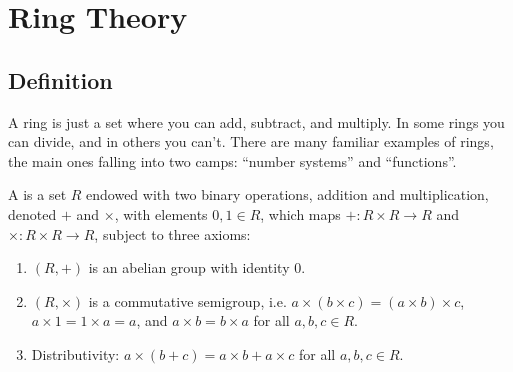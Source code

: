 \chapter{Ring Theory}
\section{Definition}
A ring is just a set where you can add, subtract, and multiply. In some rings you can divide, and in others you can't. There are many familiar examples of rings, the main ones falling into two camps: ``number systems'' and ``functions''.

\begin{definition}
A  is a set $R$ endowed with two binary operations, addition and multiplication, denoted $+$ and $\times$, with elements $0,1\in R$, which maps $+: R \times R \to R$ and $\times: R \times R \to R$, subject to three axioms:
\begin{enumerate}
\item $(R,+)$ is an abelian group with identity $0$.
\item $(R,\times)$ is a commutative semigroup, i.e. $a \times (b \times c) = (a \times b) \times c$, $a \times 1 = 1 \times a = a$, and $a \times b = b \times a$ for all $a, b, c \in R$.
\item Distributivity: $a \times (b + c) = a \times b + a \times c$ for all $a, b, c \in R$.
\end{enumerate}
\end{definition}

